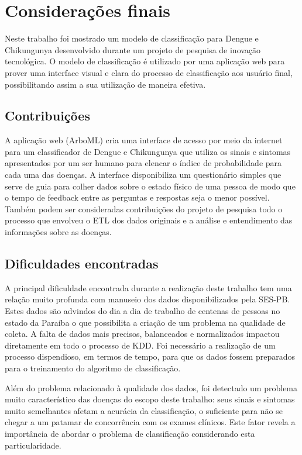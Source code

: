 \chapter{Considerações finais}

Neste trabalho foi mostrado um modelo de classificação para Dengue e Chikungunya desenvolvido durante um projeto de pesquisa de inovação tecnológica. O modelo de classificação é utilizado por uma aplicação web para prover uma interface visual e clara do processo de classificação aos usuário final, possibilitando assim a sua utilização de maneira efetiva.


\section{Contribuições}

A aplicação web (ArboML) cria uma interface de acesso por meio da internet para um classificador de Dengue e Chikungunya que utiliza os sinais e sintomas apresentados por um ser humano para elencar o índice de probabilidade para cada uma das doenças. A interface disponibiliza um questionário simples que serve de guia para colher dados sobre o estado físico de uma pessoa de modo que o tempo de feedback entre as perguntas e respostas seja o menor possível. Também podem ser consideradas contribuições do projeto de pesquisa todo o processo que envolveu o ETL dos dados originais e a análise e entendimento das informações sobre as doenças.

\section{Dificuldades encontradas}

A principal dificuldade encontrada durante a realização deste trabalho tem uma relação muito profunda com manuseio dos dados disponibilizados pela SES-PB. Estes dados são advindos do dia a dia de trabalho de centenas de pessoas no estado da Paraíba o que possibilita a criação de um problema na qualidade de coleta. A falta de dados mais precisos,  balanceados e  normalizados impactou diretamente em todo o processo de KDD. Foi necessário a realização de um processo dispendioso, em termos de tempo, para que os dados fossem preparados para o treinamento do algoritmo de classificação.

Além do problema relacionado à qualidade dos dados, foi detectado um problema muito característico das doenças do escopo deste trabalho: seus sinais e sintomas muito semelhantes afetam a acurácia da classificação, o suficiente para não se chegar a um patamar de concorrência com os exames clínicos. Este fator revela a importância de abordar o problema de classificação considerando esta particularidade.

